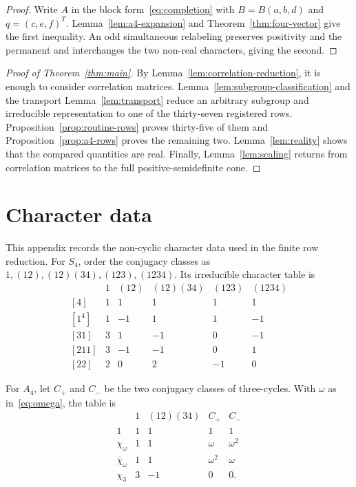 \documentclass[11pt]{article}
\theoremstyle{definition}
\begin{document}
\begin{proof}
Write $A$ in the block form~\eqref{eq:completion} with
$B=B(a,b,d)$ and $q=(c,e,f)^T$.  Lemma~\ref{lem:a4-expansion} and
Theorem~\ref{thm:four-vector} give the first inequality.  An odd simultaneous
relabeling preserves positivity and the permanent and interchanges the two
non-real characters, giving the second.
\end{proof}

\begin{proof}[Proof of Theorem~\ref{thm:main}]
By Lemma~\ref{lem:correlation-reduction}, it is enough to consider
correlation matrices.  Lemma~\ref{lem:subgroup-classification} and the
transport Lemma~\ref{lem:transport} reduce an arbitrary subgroup and
irreducible representation to one of the thirty-seven registered rows.
Proposition~\ref{prop:routine-rows} proves thirty-five of them and
Proposition~\ref{prop:a4-rows} proves the remaining two.  Lemma~\ref{lem:reality}
shows that the compared quantities are real.  Finally,
Lemma~\ref{lem:scaling} returns from correlation matrices to the full
positive-semidefinite cone.
\end{proof}

\appendix

\section{Character data}\label{app:character-data}

This appendix records the non-cyclic character data used in the finite row
reduction.  For $S_4$, order the conjugacy classes as
$1,(12),(12)(34),(123),(1234)$.  Its irreducible character table is
\begin{equation}\label{eq:s4-table}
\begin{array}{c|rrrrr}
 &1&(12)&(12)(34)&(123)&(1234)\\\hline
{[4]}    &1& 1& 1& 1& 1\\
{[1^4]}  &1&-1& 1& 1&-1\\
{[31]}   &3& 1&-1& 0&-1\\
{[211]}  &3&-1&-1& 0& 1\\
{[22]}   &2& 0& 2&-1& 0
\end{array}
\end{equation}

For $A_4$, let $C_+$ and $C_-$ be the two conjugacy classes of
three-cycles.  With $\omega$ as in~\eqref{eq:omega}, the table is
\begin{equation}\label{eq:a4-table}
\begin{array}{c|rrrr}
 &1&(12)(34)&C_+&C_-\\\hline
1&1&1&1&1\\
\chi_\omega&1&1&\omega&\omega^2\\
\bar\chi_\omega&1&1&\omega^2&\omega\\
\chi_3&3&-1&0&0.
\end{array}
\end{equation}
\end{document}
